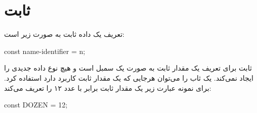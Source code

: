 

\section{ثابت}

% 

تعریف یک داده ثابت به صورت زیر است:

\begin{C++}
const name-identifier = n;
\end{C++}

ثابت برای تعریف یک مقدار ثابت به صورت یک سمبل است و هیچ نوع داده جدیدی را ایجاد
نمی‌کند.
یک ثاب را می‌توان هرجایی که یک مقدار ثابت کاربرد دارد استفاده کرد.
برای نمونه عبارت زیر یک مقدار ثابت برابر با عدد ۱۲ را تعریف می‌کند:

\begin{C++}
const DOZEN = 12;
\end{C++}